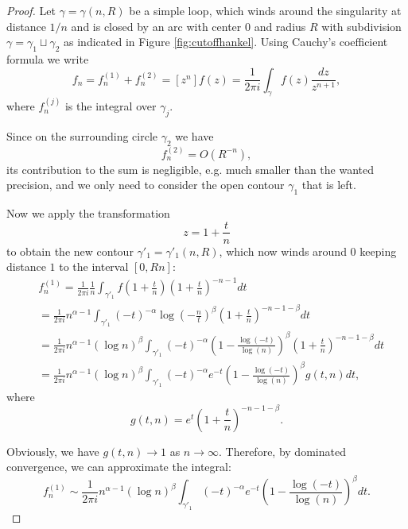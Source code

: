 \begin{proof}
Let $\gamma = \gamma(n, R)$ be a simple loop, which winds around the singularity at distance $1/n$ and is closed by an arc with center 0 and radius $R$ with subdivision $\gamma = \gamma_1 \sqcup \gamma_2$ as indicated in Figure \ref{fig:cutoffhankel}. 
Using Cauchy's coefficient formula we write
\begin{equation*}
    f_n = f_n^{(1)} + f_n^{(2)} = [z^n] f(z) = \frac{1}{2 \pi i} \int_{\gamma} f(z) \frac{dz}{z^{n+1}}, 
\end{equation*}
where $f_n^{(j)}$ is the integral over $\gamma_j$.

Since on the surrounding circle $\gamma_2$ we have
\begin{equation}
    f_n^{(2)} = O(R^{-n}), \label{eq:outercirclebound}
\end{equation}
its contribution to the sum is negligible, e.g. much smaller than the wanted precision, and we only need to consider the open contour $\gamma_1$ that is left.

Now we apply the transformation
\begin{equation*}
    z = 1 + \frac{t}{n}
\end{equation*}
to obtain the new contour $\gamma'_1 = \gamma'_1(n, R)$, which now winds around $0$ keeping distance $1$ to the interval $[0,R n]$:
\begin{align*}
    &f_n^{(1)} = \frac{1}{2 \pi i} \frac{1}{n} \int_{\gamma'_1} f\left(1 + \frac{t}{n}\right) \left( 1+\frac{t}{n} \right)^{-n-1} dt \\
    &= \frac{1}{2 \pi i} n^{\alpha - 1} \int_{\gamma'_1} (-t)^{-\alpha} \log \left( -\frac{n}{t} \right)^\beta \left(1+\frac{t}{n} \right)^{-n - 1 - \beta} dt \\
    &= \frac{1}{2 \pi i} n^{\alpha - 1} (\log n)^\beta \int_{\gamma'_1} (-t)^{-\alpha} \left(1 - \frac{\log(-t)}{\log(n)} \right) ^\beta \left(1+\frac{t}{n} \right)^{-n - 1 - \beta} dt \\
    &= \frac{1}{2 \pi i} n^{\alpha - 1} (\log n)^\beta \int_{\gamma'_1} (-t)^{-\alpha} e^{-t} \left(1 - \frac{\log(-t)}{\log(n)} \right) ^\beta g(t, n) dt, 
\end{align*}
where 
\begin{equation*}
    g(t, n) = e^t \left(1+\frac{t}{n} \right)^{-n - 1 - \beta}.
\end{equation*}

Obviously, we have $g(t,n) \to 1$ as $n \to \infty$. 
Therefore, by dominated convergence, we can approximate the integral:
\begin{equation*}
    f_n^{(1)} \sim  \frac{1}{2 \pi i} n^{\alpha - 1} (\log n)^\beta \int_{\gamma'_1} (-t)^{-\alpha} e^{-t} \left(1 - \frac{\log(-t)}{\log(n)} \right) ^\beta dt.
\end{equation*}


\end{proof}
